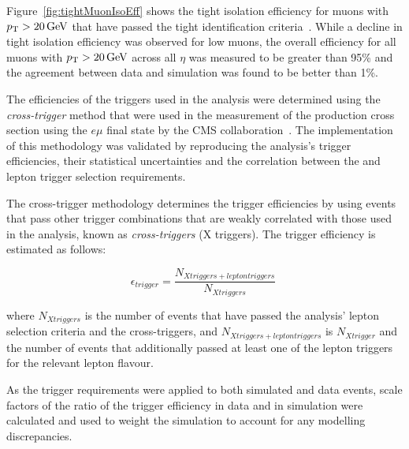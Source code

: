 Figure~\ref{fig:tightMuonIsoEff} shows the tight isolation efficiency for muons with $p_{\mathrm{T}} > 20\,\text{Ge\hspace{-.08em}V}$ that have passed the tight identification criteria~\cite{CMS-DP-2017-007}.
While a decline in tight isolation efficiency was observed for low \pT muons, the overall efficiency for all muons with $p_{\mathrm{T}} > 20\,\text{Ge\hspace{-.08em}V}$ across all $\eta$ was measured to be greater than 95\% and the agreement between data and simulation was found to be better than 1\%.

The efficiencies of the triggers used in the analysis were determined using the \emph{cross-trigger} method that were used in the measurement of the \ttbar production cross section using the $e\mu$ final state by the CMS collaboration~\cite{Khachatryan:2016kzg}.
The implementation of this methodology was validated by reproducing the \ttbar analysis's trigger efficiencies, their statistical uncertainties and the correlation between the \MET and lepton trigger selection requirements. 

The cross-trigger methodology determines the trigger efficiencies by using events that pass other trigger combinations that are weakly correlated with those used in the analysis, known as \emph{cross-triggers} (X triggers).
The trigger efficiency is estimated as follows:

\begin{equation}
\epsilon_{trigger} = \frac{N_{X triggers + lepton triggers}}{N_{X triggers}} \;
\end{equation}

where $N_{X triggers}$ is the number of events that have passed the analysis' lepton selection criteria and the cross-triggers, and $N_{X triggers + lepton triggers}$ is $N_{X trigger}$ and the number of events that additionally passed at least one of the lepton triggers for the relevant lepton flavour.

As the trigger requirements were applied to both simulated and data events, scale factors of the ratio of the trigger efficiency in data and in simulation were calculated and used to weight the simulation to account for any modelling discrepancies.


